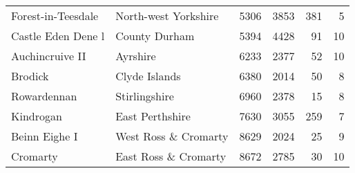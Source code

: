 \begin{table}[ht]
\begin{center}
{\begin{tabular}{llrrrr}
  Forest-in-Teesdale & North-west Yorkshire & 5306 & 3853 & 381 & 5 \\ 
  Castle Eden Dene l & County Durham & 5394 & 4428 & 91 & 10 \\ 
  Auchincruive II & Ayrshire & 6233 & 2377 & 52 & 10 \\ 
  Brodick & Clyde Islands & 6380 & 2014 & 50 & 8 \\ 
  Rowardennan & Stirlingshire & 6960 & 2378 & 15 & 8 \\ 
  Kindrogan & East Perthshire & 7630 & 3055 & 259 & 7 \\ 
  Beinn Eighe I & West Ross \& Cromarty & 8629 & 2024 & 25 & 9 \\ 
  Cromarty & East Ross \& Cromarty & 8672 & 2785 & 30 & 10 \\ 
   \bottomrule
\end{tabular}
}
\end{center}
\end{table}
